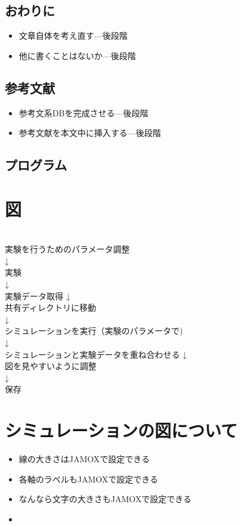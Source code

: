 	\subsection{おわりに}
		\begin{itemize}
		  \item 文章自体を考え直す---後段階
		  \item 他に書くことはないか---後段階
		\end{itemize}
	\subsection{参考文献}
		\begin{itemize}
		  \item 参考文系DBを完成させる---後段階
		  \item 参考文献を本文中に挿入する---後段階
		\end{itemize}
	\subsection{プログラム}
\section{図}
 \ \\
 実験を行うためのパラメータ調整\\
 ↓\\
 実験\\
 ↓\\
 実験データ取得
 ↓\\ 
 共有ディレクトリに移動\\
 ↓\\
 シミュレーションを実行（実験のパラメータで)\\
 ↓\\
 シミュレーションと実験データを重ね合わせる
 ↓\\
 図を見やすいように調整\\
 ↓\\
 保存\\
 
 \section{シミュレーションの図について}
 \begin{itemize}
   \item 線の大きさはJAMOXで設定できる
   \item 各軸のラベルもJAMOXで設定できる
   \item なんなら文字の大きさもJAMOXで設定できる
   \item 
 \end{itemize}
 
